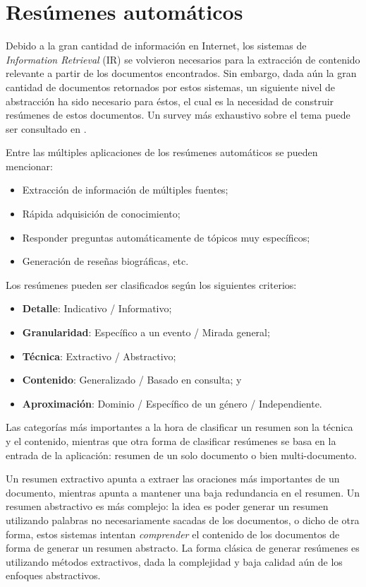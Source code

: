 \section{Resúmenes automáticos}
\label{sec-2.4}


   Debido a la gran cantidad de información en Internet, los sistemas
   de \emph{Information Retrieval} (IR) se volvieron necesarios para la
   extracción de contenido relevante a partir de los documentos
   encontrados. Sin embargo, dada aún la gran cantidad de documentos
   retornados por estos sistemas, un siguiente nivel de abstracción ha
   sido necesario para éstos, el cual es la necesidad de construir
   resúmenes de estos documentos\cite{Ganapathiraju_relevanceof}. Un
   survey más exhaustivo sobre el tema puede ser consultado en
   \cite{Das07asurvey}.

   Entre las múltiples aplicaciones de los resúmenes automáticos se
   pueden mencionar:
\begin{itemize}
\item Extracción de información de múltiples fuentes;
\item Rápida adquisición de conocimiento;
\item Responder preguntas automáticamente de tópicos muy específicos;
\item Generación de reseñas biográficas, etc.
\end{itemize}
   Los resúmenes pueden ser clasificados según los siguientes
   criterios:

\begin{itemize}
\item \textbf{Detalle}: Indicativo / Informativo;
\item \textbf{Granularidad}: Específico a un evento / Mirada general;
\item \textbf{Técnica}: Extractivo / Abstractivo;
\item \textbf{Contenido}: Generalizado / Basado en consulta; y
\item \textbf{Aproximación}: Dominio / Específico de un género /
     Independiente.
\end{itemize}
   Las categorías más importantes a la hora de clasificar un resumen
   son la técnica y el contenido, mientras que otra forma de
   clasificar resúmenes se basa en la entrada de la aplicación:
   resumen de un solo documento o bien multi-documento.

   Un resumen extractivo apunta a
   extraer las oraciones más importantes de un documento, mientras
   apunta a mantener una baja redundancia en el resumen. Un resumen
   abstractivo es más complejo: la idea es poder generar un resumen
   utilizando palabras no necesariamente sacadas de los documentos, o
   dicho de otra forma, estos sistemas intentan \emph{comprender} el
   contenido de los documentos de forma de generar un resumen
   abstracto. La forma clásica de generar resúmenes es utilizando
   métodos extractivos, dada la complejidad y baja calidad aún de los
   enfoques abstractivos.

